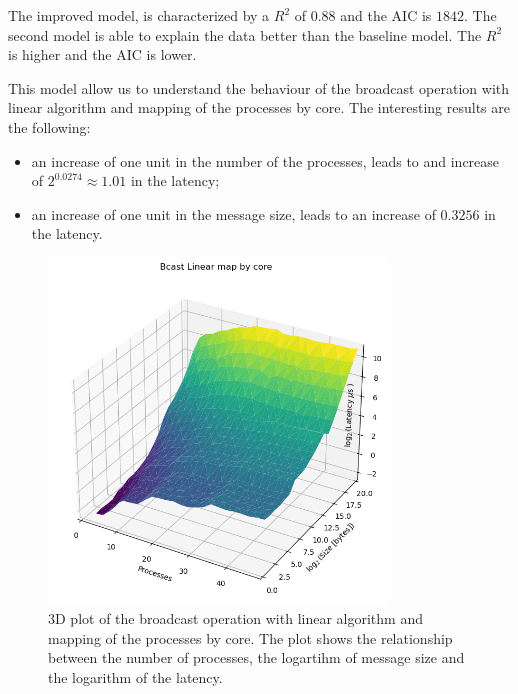 The improved model, is characterized by a $R^2$ of $0.88$ and the AIC is $1842$. The second model is able to explain the data better than the baseline model. The $R^2$ is higher and the AIC is lower.

This model allow us to understand the behaviour of the broadcast operation with linear algorithm and mapping of the processes by core. The interesting results are the following:
\begin{itemize}
    \item an increase of one unit in the number of the processes, leads to and increase of $2^{0.0274} \approx 1.01$ in the latency;
    \item an increase of one unit in the message size, leads to an increase of $0.3256$ in the latency.
\end{itemize}

\begin{figure}[h!]
    \centering
    \includegraphics[width=0.8\textwidth]{../plots/bcast_linear_core_3d.png}
    \caption{3D plot of the broadcast operation with linear algorithm and mapping of the processes by core. The plot shows the relationship between the number of processes, the logartihm of message size and the logarithm of the latency.}
\end{figure}